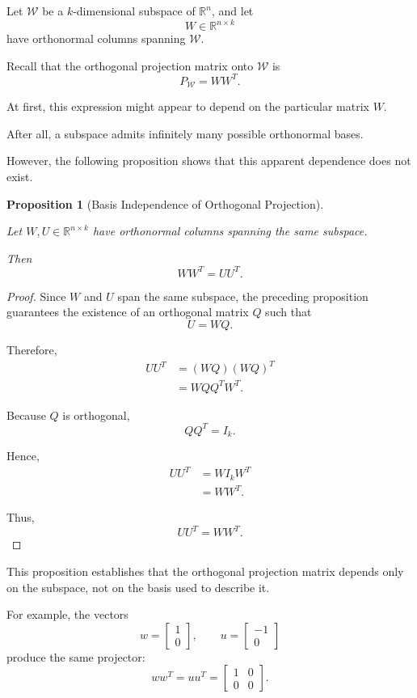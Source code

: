 \documentclass[14pt,letterpaper]{article}
\theoremstyle{plain}
\newtheorem{proposition}[theorem]{Proposition}
\theoremstyle{definition}
\theoremstyle{remark}
\newcommand{\R}{\mathbb{R}}
\begin{document}
Let $\mathcal W$ be a $k$-dimensional
subspace of $\R^n$, and let
\[
W\in\R^{n\times k}
\]
have orthonormal columns spanning
$\mathcal W$.

Recall that the orthogonal projection
matrix onto $\mathcal W$ is
\[
\boxed{
P_{\mathcal W}=WW^T.
}
\]

At first, this expression might
appear to depend on the particular
matrix $W$.

After all, a subspace admits
infinitely many possible
orthonormal bases.

However, the following proposition
shows that this apparent dependence
does not exist.

\begin{proposition}[Basis Independence of
Orthogonal Projection]
\label{prop:projection_basis_independence}

Let $W,U\in\R^{n\times k}$
have orthonormal columns spanning
the same subspace.

Then
\[
\boxed{
WW^T=UU^T.
}
\]

\end{proposition}

\begin{proof}

Since $W$ and $U$ span the
same subspace, the preceding
proposition guarantees the
existence of an orthogonal
matrix $Q$ such that
\[
U=WQ.
\]

Therefore,
\[
\begin{aligned}
UU^T
&=(WQ)(WQ)^T\\
&=WQQ^TW^T.
\end{aligned}
\]

Because $Q$ is orthogonal,
\[
QQ^T=I_k.
\]

Hence,
\[
\begin{aligned}
UU^T
&=WI_kW^T\\
&=WW^T.
\end{aligned}
\]

Thus,
\[
\boxed{
UU^T=WW^T.
}
\]

\end{proof}

This proposition establishes that
the orthogonal projection matrix
depends only on the subspace,
not on the basis used to describe it.

For example, the vectors
\[
w=
\begin{bmatrix}
1\\0
\end{bmatrix},
\qquad
u=
\begin{bmatrix}
-1\\0
\end{bmatrix}
\]
produce the same projector:
\[
ww^T
=
uu^T
=
\begin{bmatrix}
1&0\\
0&0
\end{bmatrix}.
\]
\end{document}
